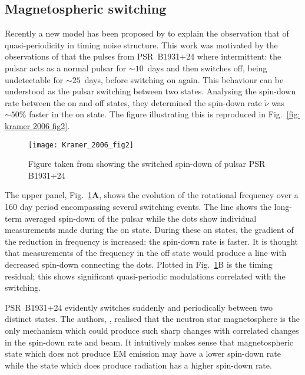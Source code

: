 \subsection{Magnetospheric switching}
\label{sec: two state switching}

Recently a new model has been proposed by \citet{Lyne2010} to explain the
observation that of quasi-periodicity in timing noise structure.
This work was motivated by the observations of \citet{Kramer2006} that the
pulses from PSR~B1931+24 where intermittent: the pulsar acts as a normal pulsar
for $\sim10$~days and then switches off, being undetectable for $\sim25$~days,
before switching on again. This behaviour can be understood as the pulsar switching
between two states. Analysing the spin-down rate between the on and off
states, they determined the spin-down rate $\dot{\nu}$ was $\sim50\%$ faster in
the on state. The figure illustrating this is reproduced in Fig.~\ref{fig:
kramer 2006 fig2}.
\begin{figure}
    \centering
    \texttt{[image: Kramer\_2006\_fig2]}
    \caption{Figure taken from \citet{Kramer2006} showing the switched spin-down
             of pulsar PSR B1931+24}
    \label{fig: kramer 2006 fig2}
\end{figure}
The  upper panel, Fig.~\ref{fig: kramer 2006 fig2}\textbf{A}, shows the
evolution of the rotational frequency over a 160 day period encompassing
several switching events. The line shows the long-term averaged spin-down of
the pulsar while the dots show individual measurements made during the on
state. During these on states, the gradient of the reduction in frequency is
increased: the spin-down rate is faster.  It is thought that measurements of
the frequency in the off state would produce a line with decreased spin-down
connecting the dots. Plotted in Fig.~\ref{fig: kramer 2006 fig2}\textrm{B} is
the timing residual; this shows significant quasi-periodic modulations
correlated with the switching.

PSR~B1931+24 evidently switches suddenly and periodically between two distinct
states. The authors, \citet{Kramer2006}, realised that the neutron star
magnetosphere is the only mechanism which could produce such sharp changes with
correlated changes in the spin-down rate and beam.  It intuitively makes sense
that magnetospheric state which does not produce EM emission may have a lower
spin-down rate while the state which does produce radiation has a higher
spin-down rate.

